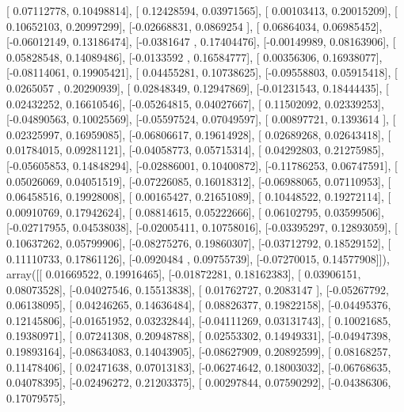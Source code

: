 \documentclass{article}
\begin{document}
       [ 0.07112778,  0.10498814],
       [ 0.12428594,  0.03971565],
       [ 0.00103413,  0.20015209],
       [ 0.10652103,  0.20997299],
       [-0.02668831,  0.0869254 ],
       [ 0.06864034,  0.06985452],
       [-0.06012149,  0.13186474],
       [-0.0381647 ,  0.17404476],
       [-0.00149989,  0.08163906],
       [ 0.05828548,  0.14089486],
       [-0.0133592 ,  0.16584777],
       [ 0.00356306,  0.16938077],
       [-0.08114061,  0.19905421],
       [ 0.04455281,  0.10738625],
       [-0.09558803,  0.05915418],
       [ 0.0265057 ,  0.20290939],
       [ 0.02848349,  0.12947869],
       [-0.01231543,  0.18444435],
       [ 0.02432252,  0.16610546],
       [-0.05264815,  0.04027667],
       [ 0.11502092,  0.02339253],
       [-0.04890563,  0.10025569],
       [-0.05597524,  0.07049597],
       [ 0.00897721,  0.1393614 ],
       [ 0.02325997,  0.16959085],
       [-0.06806617,  0.19614928],
       [ 0.02689268,  0.02643418],
       [ 0.01784015,  0.09281121],
       [-0.04058773,  0.05715314],
       [ 0.04292803,  0.21275985],
       [-0.05605853,  0.14848294],
       [-0.02886001,  0.10400872],
       [-0.11786253,  0.06747591],
       [ 0.05026069,  0.04051519],
       [-0.07226085,  0.16018312],
       [-0.06988065,  0.07110953],
       [ 0.06458516,  0.19928008],
       [ 0.00165427,  0.21651089],
       [ 0.10448522,  0.19272114],
       [ 0.00910769,  0.17942624],
       [ 0.08814615,  0.05222666],
       [ 0.06102795,  0.03599506],
       [-0.02717955,  0.04538038],
       [-0.02005411,  0.10758016],
       [-0.03395297,  0.12893059],
       [ 0.10637262,  0.05799906],
       [-0.08275276,  0.19860307],
       [-0.03712792,  0.18529152],
       [ 0.11110733,  0.17861126],
       [-0.0920484 ,  0.09755739],
       [-0.07270015,  0.14577908]]), array([[ 0.01669522,  0.19916465],
       [-0.01872281,  0.18162383],
       [ 0.03906151,  0.08073528],
       [-0.04027546,  0.15513838],
       [ 0.01762727,  0.2083147 ],
       [-0.05267792,  0.06138095],
       [ 0.04246265,  0.14636484],
       [ 0.08826377,  0.19822158],
       [-0.04495376,  0.12145806],
       [-0.01651952,  0.03232844],
       [-0.04111269,  0.03131743],
       [ 0.10021685,  0.19380971],
       [ 0.07241308,  0.20948788],
       [ 0.02553302,  0.14949331],
       [-0.04947398,  0.19893164],
       [-0.08634083,  0.14043905],
       [-0.08627909,  0.20892599],
       [ 0.08168257,  0.11478406],
       [ 0.02471638,  0.07013183],
       [-0.06274642,  0.18003032],
       [-0.06768635,  0.04078395],
       [-0.02496272,  0.21203375],
       [ 0.00297844,  0.07590292],
       [-0.04386306,  0.17079575],
\end{document}
